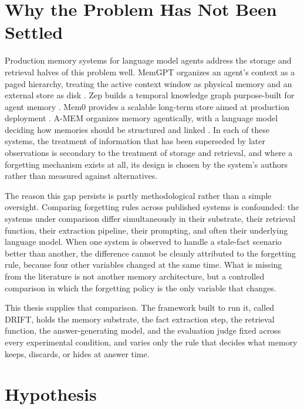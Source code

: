 \section{Why the Problem Has Not Been Settled}
\label{sec:why-not-settled}

Production memory systems for language model agents address the storage and retrieval halves of this problem well. MemGPT organizes an agent's context as a paged hierarchy, treating the active context window as physical memory and an external store as disk \citep{packer2023memgpt}. Zep builds a temporal knowledge graph purpose-built for agent memory \citep{rasmussen2025zep}. Mem0 provides a scalable long-term store aimed at production deployment \citep{chhikara2025mem0}. A-MEM organizes memory agentically, with a language model deciding how memories should be structured and linked \citep{xu2025amem}. In each of these systems, the treatment of information that has been superseded by later observations is secondary to the treatment of storage and retrieval, and where a forgetting mechanism exists at all, its design is chosen by the system's authors rather than measured against alternatives.

The reason this gap persists is partly methodological rather than a simple oversight. Comparing forgetting rules across published systems is confounded: the systems under comparison differ simultaneously in their substrate, their retrieval function, their extraction pipeline, their prompting, and often their underlying language model. When one system is observed to handle a stale-fact scenario better than another, the difference cannot be cleanly attributed to the forgetting rule, because four other variables changed at the same time. What is missing from the literature is not another memory architecture, but a controlled comparison in which the forgetting policy is the only variable that changes.

This thesis supplies that comparison. The framework built to run it, called DRIFT, holds the memory substrate, the fact extraction step, the retrieval function, the answer-generating model, and the evaluation judge fixed across every experimental condition, and varies only the rule that decides what memory keeps, discards, or hides at answer time.

\section{Hypothesis}
\label{sec:hypothesis}

